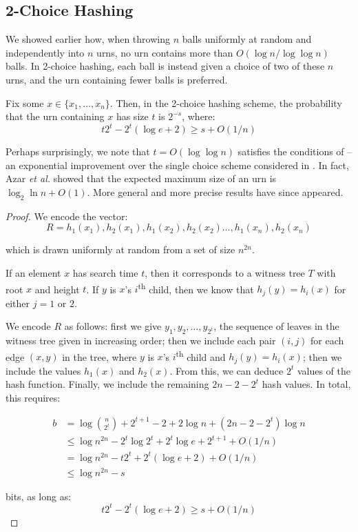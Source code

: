 \documentclass{patmorin}
\begin{document}
\subsection{2-Choice Hashing}

We showed earlier how, when throwing $n$ balls uniformly at random and
independently into $n$ urns, no urn contains more than
$O(\log n/\log \log n)$ balls. In 2-choice hashing, each ball is
instead given a choice of two of these $n$ urns, and the urn
containing fewer balls is preferred.

\begin{thm}
  Fix some $x \in \{x_1, \ldots, x_n\}$. Then, in the 2-choice hashing
  scheme, the probability that the urn containing $x$ has size $t$ is
  $2^{-s}$, where:
  \[t 2^t - 2^t(\log e + 2) \geq s + O(1/n)\]
\end{thm}

Perhaps surprisingly, we note that $t = O(\log \log n)$ satisfies the
conditions of  -- an exponential improvement
over the single choice scheme considered in . In fact,
Azar {\em et al.} \cite{azar:multiplechoice} showed that the expected
maximum size of an urn is $\log_2 \ln n + O(1)$. More general and more
precise results have since appeared.

\begin{proof}
  We encode the vector:
  \[
  R = h_1(x_1), h_2(x_1), h_1(x_2), h_2(x_2) \ldots, h_1(x_n), h_2(x_n)
  \]

  which is drawn uniformly at random from a set of size $n^{2n}$.

  If an element $x$ has search time $t$, then it corresponds to a
  witness tree $T$ with root $x$ and height $t$. If $y$ is $x$'s
  $i$\textsuperscript{th} child, then we know that $h_j(y) = h_i(x)$
  for either $j = 1$ or $2$.

  We encode $R$ as follows: first we give $y_1, y_2, \ldots, y_{2^t}$,
  the sequence of leaves in the witness tree given in increasing
  order; then we include each pair $(i, j)$ for each edge $(x, y)$ in
  the tree, where $y$ is $x$'s $i$\textsuperscript{th} child and
  $h_j(y) = h_i(x)$; then we include the values $h_1(x)$ and
  $h_2(x)$. From this, we can deduce $2^t$ values of the hash
  function. Finally, we include the remaining $2n - 2 - 2^t$ hash
  values. In total, this requires:

  \begin{align*}
    b & = \log \binom{n}{2^t} + 2^{t + 1} - 2 + 2\log n + (2n - 2 - 2^t)\log n \\
      & \le \log n^{2n} - 2^t \log 2^t + 2^t \log e + 2^{t + 1} + O(1/n) \\
      & = \log n^{2n} - t 2^t + 2^t (\log e + 2) + O(1/n) \\
      & \le \log n^{2n} - s
  \end{align*}

  bits, as long as:
  \[t 2^t - 2^t(\log e + 2) \geq s + O(1/n)\]
\end{proof}
\end{document}
